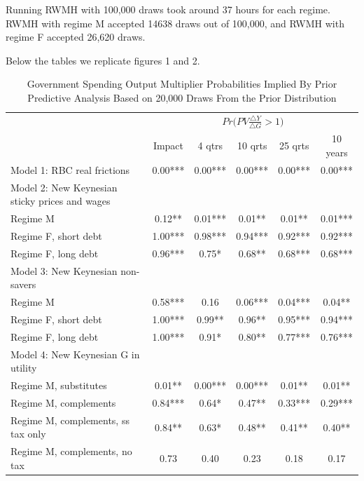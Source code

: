 \documentclass[letterpaper,12pt]{article}%
\begin{document}
Running RWMH with 100,000 draws took around 37 hours for each regime. RWMH with regime M accepted 14638 draws out of 100,000, and RWMH with regime F accepted 26,620 draws.

Below the tables we replicate figures 1 and 2.


\begin{table}[H]
    \centering
    \begin{threeparttable}
    \caption{Government Spending Output Multiplier Probabilities Implied By Prior Predictive Analysis Based on 20,000 Draws From the Prior Distribution}
    \begin{tabular}{l c c c c c}
    \toprule
        & \multicolumn{5}{c}{$Pr\Big(PV \frac{\triangle Y}{\triangle G}>1\Big)$}\\
      \cmidrule{2-6}
        & Impact & 4 qtrs & 10 qrts & 25 qrts & 10 years \\
       \midrule
     Model 1: RBC real frictions & 0.00***   & 0.00***  & 0.00***  & 0.00***  & 0.00*** \\
     Model 2: New Keynesian sticky prices and wages  &    &   &   &   &       \\
     \quad Regime M & 0.12** & 0.01*** & 0.01** & 0.01** & 0.01***  \\
     \quad Regime F, short debt & 1.00*** &  0.98***  & 0.94*** & 0.92***  & 0.92***  \\
     \quad Regime F, long debt &  0.96*** & 0.75* & 0.68** &  0.68***  & 0.68***  \\
     Model 3: New Keynesian non-savers &    &   &   &   &  \\
     \quad Regime M &   0.58*** & 0.16 & 0.06***  & 0.04*** & 0.04** \\
     \quad Regime F, short debt &  1.00*** &  0.99**  & 0.96** & 0.95***  & 0.94*** \\
     \quad Regime F, long debt &   1.00*** & 0.91* & 0.80** & 0.77***  & 0.76*** \\
     Model 4: New Keynesian G in utility &    &   &   &   &  \\
     \quad Regime M, substitutes &   0.01** & 0.00*** & 0.00***  & 0.01**  & 0.01**  \\
     \quad Regime M, complements &   0.84*** &  0.64* &  0.47**  & 0.33***  & 0.29***  \\
     \quad Regime M, complements, ss tax only &   0.84** & 0.63*  & 0.48** & 0.41** & 0.40**  \\
     \quad Regime M, complements, no tax &   0.73 &  0.40 & 0.23  & 0.18 & 0.17 \\

\end{tabular}
\end{threeparttable}
\end{table}
\end{document}
